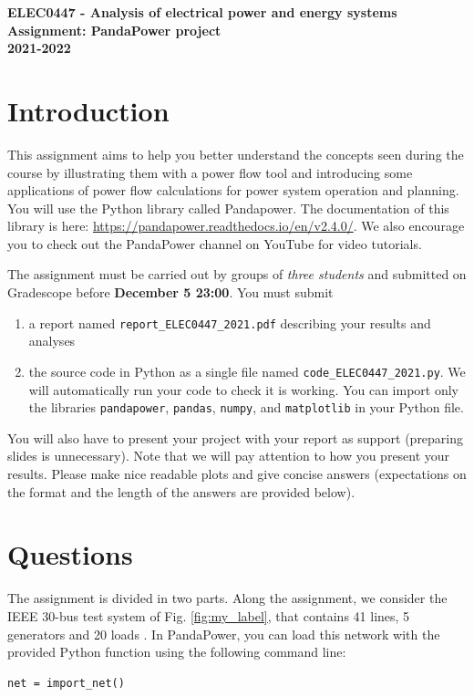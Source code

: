 \documentclass[11pt,a4paper]{article}
\begin{document}
\begin{center}
\vspace{-3cm}
\Large{\textbf{ELEC0447 - Analysis of electrical power and energy systems}\\}
\bigskip
\Large{\textbf{Assignment: PandaPower project}\\}
\bigskip
\Large{\textbf{2021-2022}\\}

\end{center}



\section{Introduction}
This assignment aims to help you better understand the concepts seen during the course by illustrating them with a power flow tool and introducing some applications of power flow calculations for power system operation and planning.
You will use the Python library called Pandapower. The documentation of this library is here: \url{https://pandapower.readthedocs.io/en/v2.4.0/}. We also encourage you to check out the PandaPower channel on YouTube for video tutorials.

The assignment must be carried out by groups of \textit{three students} and submitted on Gradescope before \textbf{December 5 23:00}. You must submit 
\begin{enumerate}
\item a report named \verb|report_ELEC0447_2021.pdf| describing your results and analyses
\item the source code in Python as a single file named \verb|code_ELEC0447_2021.py|. We will automatically run your code to check it is working. You can import only the libraries \verb|pandapower|, \verb|pandas|, \verb|numpy|, and \verb|matplotlib| in your Python file.
\end{enumerate} 

You will also have to present your project with your report as support (preparing slides is unnecessary). Note that we will pay attention to how you present your results. Please make nice readable plots and give concise answers (expectations on the format and the length of the answers are provided below).


\section{Questions}
The assignment is divided in two parts. Along the assignment, we consider the IEEE 30-bus test system of Fig. \ref{fig:my_label}, that contains 41 lines, 5 generators and 20 loads \cite{Li2010}. In PandaPower, you can load this network with the provided Python function using the following command line:
\begin{lstlisting}
net = import_net()
\end{lstlisting}
\end{document}
